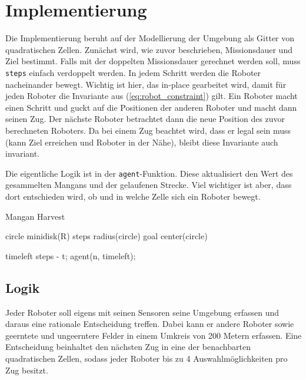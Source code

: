 \documentclass{article}
\begin{document}
\clearpage
\section{Implementierung}

Die Implementierung beruht auf der Modellierung der Umgebung als Gitter von quadratischen Zellen. Zunächst wird, wie zuvor beschrieben, Missionsdauer und Ziel bestimmt. Falls mit der doppelten Missionsdauer gerechnet werden soll, muss \texttt{steps} einfach verdoppelt werden. In jedem Schritt werden die Roboter nacheinander bewegt. Wichtig ist hier, das in-place gearbeitet wird, damit für jeden Roboter die Invariante aus (\ref{eq:robot_constraint}) gilt. Ein Roboter macht einen Schritt und guckt auf die Positionen der anderen Roboter und macht dann seinen Zug. Der nächste Roboter betrachtet dann die neue Position des zuvor berechneten Roboters. Da bei einem Zug beachtet wird, dass er legal sein muss (kann Ziel erreichen und Roboter in der Nähe), bleibt diese Invariante auch invariant.

Die eigentliche Logik ist in der \texttt{agent}-Funktion. Diese aktualisiert den Wert des gesammelten Mangans und der gelaufenen Strecke. Viel wichtiger ist aber, dass dort entschieden wird, ob und in welche Zelle sich ein Roboter bewegt.

\begin{algorithm}[H]
    \caption{Mangan Harvest}  
    \KwResult{}
    \BlankLine
    circle \textleftarrow  minidisk(R)\;  
    steps \textleftarrow  radius(circle)\;
    goal \textleftarrow center(circle)\; 
 
     {
      timeleft \textleftarrow steps - t;
       {
        agent(n, timeleft);
      }
    }

\end{algorithm} 

\subsection{Logik}

Jeder Roboter soll eigens mit seinen Sensoren seine Umgebung erfassen und daraus
eine rationale Entscheidung treffen. Dabei kann er andere Roboter sowie
geerntete und ungeerntere Felder in einem Umkreis von 200 Metern erfassen. Eine
Entscheidung beinhaltet den nächsten Zug in eine der benachbarten quadratischen
Zellen, sodass jeder Roboter bis zu 4 Auswahlmöglichkeiten pro Zug besitzt.
\end{document}
